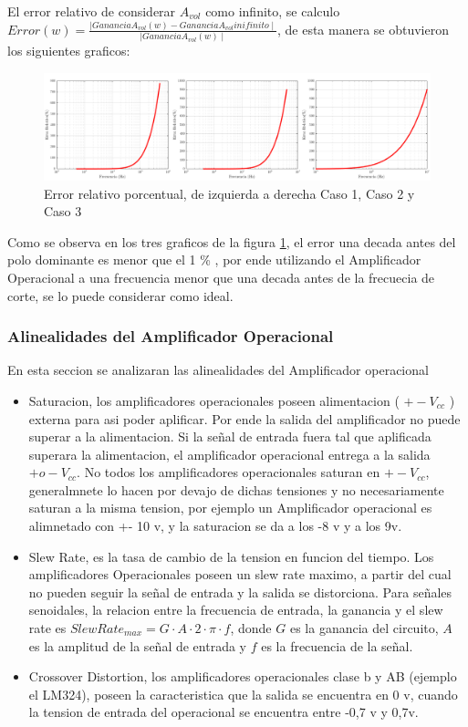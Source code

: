 \documentclass[../../main.tex]{subfiles}
\begin{document}

El error relativo de considerar $A_{vol}$  como infinito, se calculo $ Error(w) = \frac {\mid Ganancia A_{vol}(w) -Ganancia A_{vol} inifinito \mid} {\mid Ganancia A_{vol} (w) \mid }$, de esta manera se obtuvieron los siguientes graficos:

\begin{figure}[H]
\centering
\includegraphics[width=1\textwidth]{error_inv}
\caption{Error relativo porcentual, de izquierda a derecha Caso 1, Caso 2 y Caso 3} \label{fig=errorInv}
\end{figure}


Como se observa en los tres graficos de la figura \ref{fig=errorInv}, el error una decada antes del polo dominante es menor que el 1 \% , por ende utilizando el Amplificador Operacional a una frecuencia menor que una decada antes de la frecuecia de corte, se lo puede considerar como ideal.
\subsubsection{Alinealidades del Amplificador Operacional}
En esta seccion se analizaran las alinealidades del Amplificador operacional
\begin{itemize}  
\item Saturacion, los amplificadores operacionales poseen alimentacion ( $+-V_{cc}$ ) externa para asi poder aplificar. Por ende la salida del amplificador no puede superar a la alimentacion. Si la señal de entrada fuera tal que aplificada superara la alimentacion, el amplificador operacional entrega a la salida $+ o -V_{cc}$. No todos los amplificadores operacionales saturan en $+-V_{cc}$, generalmnete lo hacen por devajo de dichas tensiones y no necesariamente saturan a la misma tension, por ejemplo un Amplificador operacional es alimnetado con +- 10 v, y la saturacion se da a los -8 v y a los 9v. 
\item Slew Rate, es la tasa de cambio de la tension en funcion del tiempo. Los amplificadores Operacionales poseen un slew rate maximo, a partir del cual no pueden seguir la señal de entrada y la salida se distorciona. Para señales senoidales, la relacion entre la frecuencia de entrada, la ganancia y el slew rate es $ SlewRate_{max}=G  \cdot A \cdot 2 \cdot \pi \cdot f $, donde $ G $ es la ganancia del circuito, $ A $ es la amplitud de la señal de entrada y $f$ es la frecuencia de la señal.  
\item Crossover Distortion, los amplificadores operacionales clase b y AB (ejemplo el LM324), poseen la caracteristica que la salida se encuentra en 0 v, cuando la tension de entrada del operacional se encuentra entre -0,7 v y 0,7v.
\end{itemize}
\end{document}
